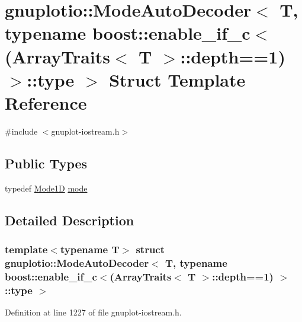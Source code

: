 \hypertarget{structgnuplotio_1_1_mode_auto_decoder_3_01_t_00_01typename_01boost_1_1enable__if__c_3_07_array_t1ec50a546e6580c42fe67da3e27f4154}{}\section{gnuplotio\+:\+:Mode\+Auto\+Decoder$<$ T, typename boost\+:\+:enable\+\_\+if\+\_\+c$<$(Array\+Traits$<$ T $>$\+:\+:depth==1) $>$\+:\+:type $>$ Struct Template Reference}
\label{structgnuplotio_1_1_mode_auto_decoder_3_01_t_00_01typename_01boost_1_1enable__if__c_3_07_array_t1ec50a546e6580c42fe67da3e27f4154}


{\ttfamily \#include $<$gnuplot-\/iostream.\+h$>$}

\subsection*{Public Types}
\begin{DoxyCompactItemize}
\item 
typedef \hyperlink{structgnuplotio_1_1_mode1_d}{Mode1D} \hyperlink{structgnuplotio_1_1_mode_auto_decoder_3_01_t_00_01typename_01boost_1_1enable__if__c_3_07_array_t1ec50a546e6580c42fe67da3e27f4154_a4864f829821c6058d5ada30fb74731ca}{mode}
\end{DoxyCompactItemize}


\subsection{Detailed Description}
\subsubsection*{template$<$typename T$>$\newline
struct gnuplotio\+::\+Mode\+Auto\+Decoder$<$ T, typename boost\+::enable\+\_\+if\+\_\+c$<$(\+Array\+Traits$<$ T $>$\+::depth==1) $>$\+::type $>$}



Definition at line 1227 of file gnuplot-\/iostream.\+h.



